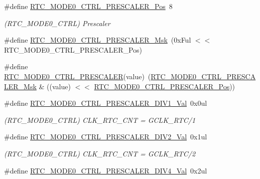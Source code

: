 \begin{DoxyCompactItemize}
\item 
\#define \mbox{\hyperlink{group___s_a_m_d21___r_t_c_gae6a98daefadfa386b8f37022a707044e}{R\+T\+C\+\_\+\+M\+O\+D\+E0\+\_\+\+C\+T\+R\+L\+\_\+\+P\+R\+E\+S\+C\+A\+L\+E\+R\+\_\+\+Pos}}~8
\begin{DoxyCompactList}\small\item\em (R\+T\+C\+\_\+\+M\+O\+D\+E0\+\_\+\+C\+T\+RL) Prescaler \end{DoxyCompactList}\item 
\#define \mbox{\hyperlink{group___s_a_m_d21___r_t_c_gab795c61438e1a1b21c718cb0db90d836}{R\+T\+C\+\_\+\+M\+O\+D\+E0\+\_\+\+C\+T\+R\+L\+\_\+\+P\+R\+E\+S\+C\+A\+L\+E\+R\+\_\+\+Msk}}~(0x\+Ful $<$$<$ R\+T\+C\+\_\+\+M\+O\+D\+E0\+\_\+\+C\+T\+R\+L\+\_\+\+P\+R\+E\+S\+C\+A\+L\+E\+R\+\_\+\+Pos)
\item 
\#define \mbox{\hyperlink{group___s_a_m_d21___r_t_c_ga7e83d489460b8ebd357200a02a63d5b9}{R\+T\+C\+\_\+\+M\+O\+D\+E0\+\_\+\+C\+T\+R\+L\+\_\+\+P\+R\+E\+S\+C\+A\+L\+ER}}(value)~(\mbox{\hyperlink{group___s_a_m_d21___r_t_c_gab795c61438e1a1b21c718cb0db90d836}{R\+T\+C\+\_\+\+M\+O\+D\+E0\+\_\+\+C\+T\+R\+L\+\_\+\+P\+R\+E\+S\+C\+A\+L\+E\+R\+\_\+\+Msk}} \& ((value) $<$$<$ \mbox{\hyperlink{group___s_a_m_d21___r_t_c_gae6a98daefadfa386b8f37022a707044e}{R\+T\+C\+\_\+\+M\+O\+D\+E0\+\_\+\+C\+T\+R\+L\+\_\+\+P\+R\+E\+S\+C\+A\+L\+E\+R\+\_\+\+Pos}}))
\item 
\#define \mbox{\hyperlink{group___s_a_m_d21___r_t_c_gab83b5689ebf22a3732d6b26604849711}{R\+T\+C\+\_\+\+M\+O\+D\+E0\+\_\+\+C\+T\+R\+L\+\_\+\+P\+R\+E\+S\+C\+A\+L\+E\+R\+\_\+\+D\+I\+V1\+\_\+\+Val}}~0x0ul
\begin{DoxyCompactList}\small\item\em (R\+T\+C\+\_\+\+M\+O\+D\+E0\+\_\+\+C\+T\+RL) C\+L\+K\+\_\+\+R\+T\+C\+\_\+\+C\+NT = G\+C\+L\+K\+\_\+\+R\+T\+C/1 \end{DoxyCompactList}\item 
\#define \mbox{\hyperlink{group___s_a_m_d21___r_t_c_ga3876073889ac5e0eb43ce6327917af05}{R\+T\+C\+\_\+\+M\+O\+D\+E0\+\_\+\+C\+T\+R\+L\+\_\+\+P\+R\+E\+S\+C\+A\+L\+E\+R\+\_\+\+D\+I\+V2\+\_\+\+Val}}~0x1ul
\begin{DoxyCompactList}\small\item\em (R\+T\+C\+\_\+\+M\+O\+D\+E0\+\_\+\+C\+T\+RL) C\+L\+K\+\_\+\+R\+T\+C\+\_\+\+C\+NT = G\+C\+L\+K\+\_\+\+R\+T\+C/2 \end{DoxyCompactList}\item 
\#define \mbox{\hyperlink{group___s_a_m_d21___r_t_c_ga23ddb56c7b7ab407e943449a261d904b}{R\+T\+C\+\_\+\+M\+O\+D\+E0\+\_\+\+C\+T\+R\+L\+\_\+\+P\+R\+E\+S\+C\+A\+L\+E\+R\+\_\+\+D\+I\+V4\+\_\+\+Val}}~0x2ul

\end{DoxyCompactItemize}
